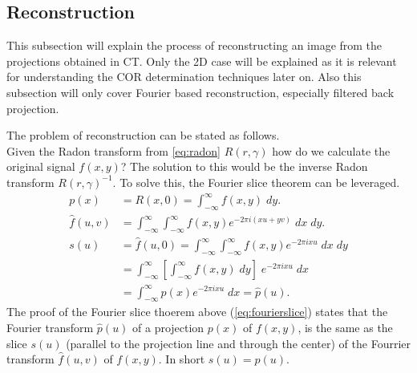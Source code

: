 \documentclass[10pt,journal,compsoc]{IEEEtran}
\begin{document}
\subsection{Reconstruction}
This subsection will explain the process of reconstructing an image from the projections obtained in CT.
Only the 2D case will be explained as it is relevant for understanding the COR determination techniques later on.
Also this subsection will only cover Fourier based reconstruction, especially filtered back projection.

The problem of reconstruction can be stated as follows.\\
Given the Radon transform from \cref{eq:radon} $R(r,\gamma)$ how do we calculate the original signal $f(x,y)$?
The solution to this would be the inverse Radon transform $R(r,\gamma)^{-1}$.
To solve this, the Fourier slice theorem can be leveraged.
%
\begin{align}
p(x) &= R(x,0) = \int_{-\infty}^{\infty} f(x,y)\;dy. 
\\
\hat{f}(u,v) &= \int_{-\infty}^{\infty}\int_{-\infty}^{\infty}f(x,y)e^{-2\pi i (xu+yv)}\;dx\;dy.
\\
s(u) &= \hat{f}(u,0) = \int_{-\infty}^{\infty}\int_{-\infty}^{\infty}f(x,y)e^{-2\pi i xu}\;dx\;dy
\label{eq:fourierslice}
\\
&= \int_{-\infty}^{\infty}\left[\int_{-\infty}^{\infty}f(x,y)\;dy\right]\;e^{-2\pi i xu}\;dx
\nonumber
\\
&= \int_{-\infty}^{\infty}p(x)e^{-2\pi i xu}\;dx = \hat{p}(u).
\nonumber
\end{align}
%
The proof of the Fourier slice thoerem above (\cref{eq:fourierslice}) states that the Fourier transform $\hat{p}(u)$ of a projection $p(x)$ of $f(x,y)$, is the same as the slice $s(u)$ (parallel to the projection line and through the center) of the Fourrier transform $\hat{f}(u,v)$ of $f(x,y)$.
In short $s(u) = \hat{p}(u)$.
\end{document}
